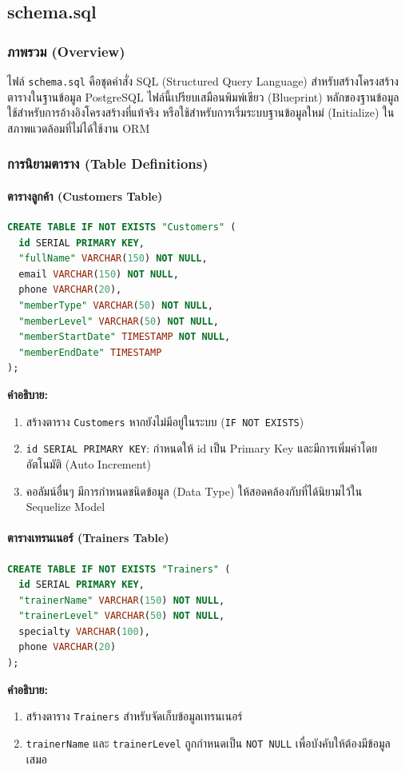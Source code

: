 \subsection{schema.sql}

\subsubsection{ภาพรวม (Overview)}
ไฟล์ \texttt{schema.sql} คือชุดคำสั่ง SQL (Structured Query Language) สำหรับสร้างโครงสร้างตารางในฐานข้อมูล PostgreSQL ไฟล์นี้เปรียบเสมือนพิมพ์เขียว (Blueprint) หลักของฐานข้อมูล ใช้สำหรับการอ้างอิงโครงสร้างที่แท้จริง หรือใช้สำหรับการเริ่มระบบฐานข้อมูลใหม่ (Initialize) ในสภาพแวดล้อมที่ไม่ได้ใช้งาน ORM

\subsubsection{การนิยามตาราง (Table Definitions)}

\paragraph{ตารางลูกค้า (Customers Table)}
\begin{lstlisting}[language=SQL, caption={ซอร์สโค้ดจากไฟล์ schema.sql}, label={code:schema-sql-customers}]
CREATE TABLE IF NOT EXISTS "Customers" (
  id SERIAL PRIMARY KEY,
  "fullName" VARCHAR(150) NOT NULL,
  email VARCHAR(150) NOT NULL,
  phone VARCHAR(20),
  "memberType" VARCHAR(50) NOT NULL,
  "memberLevel" VARCHAR(50) NOT NULL,
  "memberStartDate" TIMESTAMP NOT NULL,
  "memberEndDate" TIMESTAMP
);
\end{lstlisting}
\textbf{คำอธิบาย:}
\begin{enumerate}
    \item สร้างตาราง \texttt{Customers} หากยังไม่มีอยู่ในระบบ (\texttt{IF NOT EXISTS})
    \item \texttt{id SERIAL PRIMARY KEY}: กำหนดให้ id เป็น Primary Key และมีการเพิ่มค่าโดยอัตโนมัติ (Auto Increment)
    \item คอลัมน์อื่นๆ มีการกำหนดชนิดข้อมูล (Data Type) ให้สอดคล้องกับที่ได้นิยามไว้ใน Sequelize Model
\end{enumerate}

\paragraph{ตารางเทรนเนอร์ (Trainers Table)}
\begin{lstlisting}[language=SQL, caption={ซอร์สโค้ดจากไฟล์ schema.sql}, label={code:schema-sql-trainers}]
CREATE TABLE IF NOT EXISTS "Trainers" (
  id SERIAL PRIMARY KEY,
  "trainerName" VARCHAR(150) NOT NULL,
  "trainerLevel" VARCHAR(50) NOT NULL,
  specialty VARCHAR(100),
  phone VARCHAR(20)
);
\end{lstlisting}
\textbf{คำอธิบาย:}
\begin{enumerate}
    \item สร้างตาราง \texttt{Trainers} สำหรับจัดเก็บข้อมูลเทรนเนอร์
    \item \texttt{trainerName} และ \texttt{trainerLevel} ถูกกำหนดเป็น \texttt{NOT NULL} เพื่อบังคับให้ต้องมีข้อมูลเสมอ
\end{enumerate}

